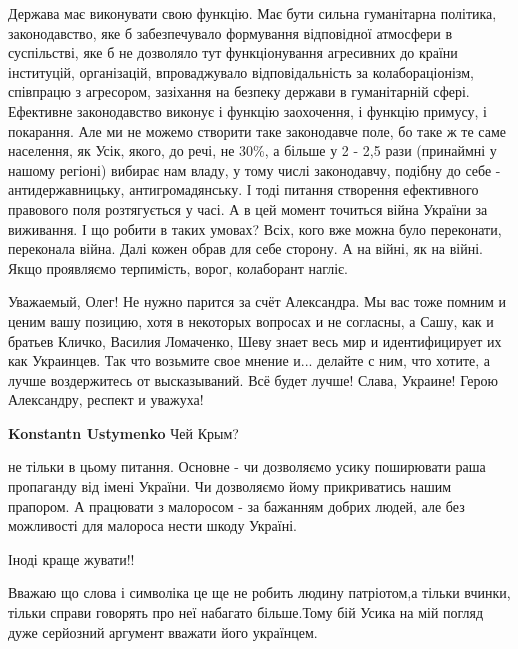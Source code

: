 \begin{itemize}

Держава має виконувати свою функцію. Має бути сильна гуманітарна політика,
законодавство, яке б забезпечувало формування відповідної атмосфери в
суспільстві, яке б не дозволяло тут функціонування агресивних до країни
інституцій, організацій, впроваджувало відповідальність за колабораціонізм,
співпрацю з агресором, зазіхання на безпеку держави в гуманітарній сфері.
Ефективне законодавство виконує і функцію заохочення, і функцію примусу, і
покарання. Але ми не можемо створити таке законодавче поле, бо таке ж те саме
населення, як Усік, якого, до речі, не 30\%, а більше у 2 - 2,5 рази (принаймні
у нашому регіоні) вибирає нам владу, у тому числі законодавчу, подібну до себе
- антидержавницьку, антигромадянську. І тоді питання створення ефективного
правового поля розтягується у часі. А в цей момент точиться війна України за
виживання. І що робити в таких умовах? Всіх, кого вже можна було переконати,
переконала війна. Далі кожен обрав для себе сторону. А на війні, як на війні.
Якщо проявляємо терпимість, ворог, колаборант нагліє.


Уважаемый, Олег! Не нужно парится за счёт Александра. Мы вас тоже помним и
ценим вашу позицию, хотя в некоторых вопросах и не согласны, а Сашу, как и
братьев Кличко, Василия Ломаченко, Шеву знает весь мир и идентифицирует их как
Украинцев. Так что возьмите свое мнение и... делайте с ним, что хотите, а лучше
воздержитесь от высказываний. Всё будет лучше! Слава, Украине! Герою
Александру, респект и уважуха!

\begin{itemize} %
\textbf{Konstantn Ustymenko} Чей Крым?
\end{itemize} %


не тільки в цьому питання. Основне - чи дозволяємо усику поширювати раша
пропаганду від імені України. Чи дозволяємо йому прикриватись нашим прапором. А
працювати з малоросом - за бажанням добрих людей, але без можливості для
малороса нести шкоду Україні.


Іноді краще жувати!!


Вважаю що слова і символіка це ще не робить людину патріотом,а тільки вчинки,
тільки справи говорять про неї набагато більше.Тому бій Усика на мій погляд
дуже серйозний аргумент вважати його українцем.


\end{itemize}
